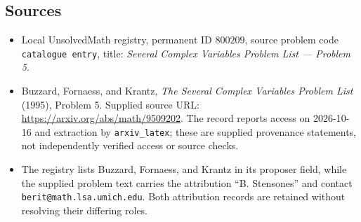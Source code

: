\documentclass[11pt]{article}
\begin{document}
\subsection{Sources}
\begin{itemize}
\item Local UnsolvedMath registry, permanent ID \(800209\), source problem code \texttt{catalogue entry}, title: \emph{Several Complex Variables Problem List --- Problem 5}.
\item Buzzard, Fornaess, and Krantz, \emph{The Several Complex Variables Problem List} (1995), Problem 5. Supplied source URL: \url{https://arxiv.org/abs/math/9509202}. The record reports access on 2026-10-16 and extraction by \texttt{arxiv\_latex}; these are supplied provenance statements, not independently verified access or source checks.
\item The registry lists Buzzard, Fornaess, and Krantz in its proposer field, while the supplied problem text carries the attribution ``B. Stensones'' and contact \texttt{berit@math.lsa.umich.edu}. Both attribution records are retained without resolving their differing roles.
\end{itemize}
\end{document}
